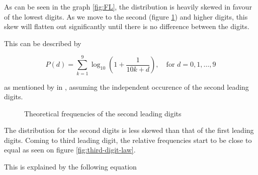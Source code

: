 As can be seen in the graph \ref{fig:FL}, the distribution is heavily skewed in favour of the lowest digits. As we move to the second (figure \ref{fig:second-digit-law}) and higher digits, this skew will flatten out significantly until there is no difference between the digits.  \cite{kossovsky2014benford}

This can be described by 

\begin{equation}
    \label{BZ-general_second}
    P(d) = \sum\limits_{k=1}^{9} \log_{10}\left( 1+\frac{1}{10k+d}\right), \quad \text{for } d = 0,1,\dots,9
\end{equation}

as mentioned by \citeauthor{Hronova2023} in \citeyear{Hronova2023}, assuming the independent occurence of the second leading digits. 

\begin{figure}[h]
    \centering
    \caption{Theoretical frequencies of the second leading digits}  
    \label{fig:second-digit-law}
        \pgfplotsset{width=8.5cm,compat=1.18}
\end{figure}

The distribution for the second digits is less skewed than that of the first leading digits. Coming to third leading digit, the relative frequencies start to be close to equal as seen on figure \ref{fig:third-digit-law}. \cite{kossovsky2014benford}

This is explained by the following equation 

